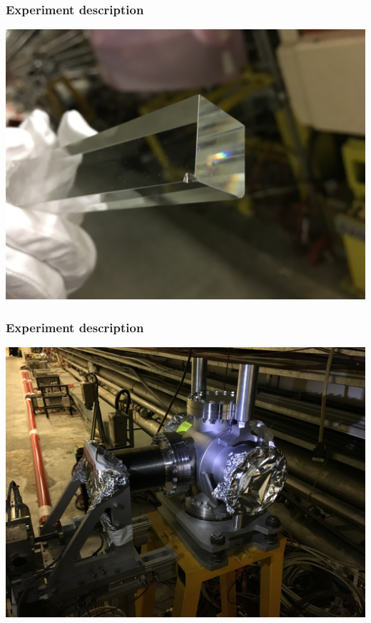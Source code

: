 \begin{frame}
\frametitle{Experiment description}
\includegraphics[width=0.95\linewidth]{./photos_Format02/IMG-2852.JPG}
\begin{figure}
\end{figure}
\end{frame}


\begin{frame}
\frametitle{Experiment description}
\includegraphics[width=0.95\linewidth]{./photos_Format02/IMG-2856.JPG}
\begin{figure}
\end{figure}
\end{frame}



